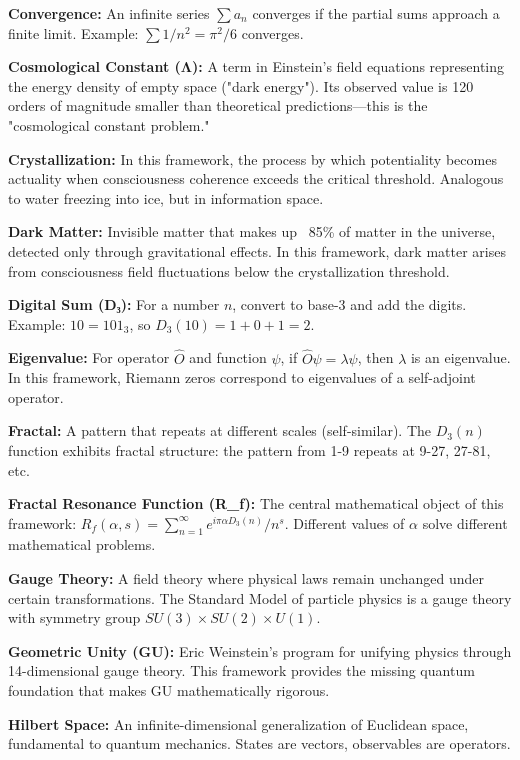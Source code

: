\noindent\textbf{Convergence:} An infinite series $\sum a_n$ converges if the partial sums approach a finite limit. Example: $\sum 1/n^2 = \pi^2/6$ converges.

\noindent\textbf{Cosmological Constant (Λ):} A term in Einstein's field equations representing the energy density of empty space ("dark energy"). Its observed value is 120 orders of magnitude smaller than theoretical predictions—this is the "cosmological constant problem."

\noindent\textbf{Crystallization:} In this framework, the process by which potentiality becomes actuality when consciousness coherence exceeds the critical threshold. Analogous to water freezing into ice, but in information space.

\noindent\textbf{Dark Matter:} Invisible matter that makes up ~85\% of matter in the universe, detected only through gravitational effects. In this framework, dark matter arises from consciousness field fluctuations below the crystallization threshold.

\noindent\textbf{Digital Sum (D₃):} For a number $n$, convert to base-3 and add the digits. Example: $10 = 101_3$, so $D_3(10) = 1 + 0 + 1 = 2$.

\noindent\textbf{Eigenvalue:} For operator $\hat{O}$ and function $\psi$, if $\hat{O}\psi = \lambda\psi$, then $\lambda$ is an eigenvalue. In this framework, Riemann zeros correspond to eigenvalues of a self-adjoint operator.

\noindent\textbf{Fractal:} A pattern that repeats at different scales (self-similar). The $D_3(n)$ function exhibits fractal structure: the pattern from 1-9 repeats at 9-27, 27-81, etc.

\noindent\textbf{Fractal Resonance Function (R_f):} The central mathematical object of this framework: $R_f(\alpha, s) = \sum_{n=1}^{\infty} e^{i\pi\alpha D_3(n)}/n^s$. Different values of $\alpha$ solve different mathematical problems.

\noindent\textbf{Gauge Theory:} A field theory where physical laws remain unchanged under certain transformations. The Standard Model of particle physics is a gauge theory with symmetry group $SU(3) \times SU(2) \times U(1)$.

\noindent\textbf{Geometric Unity (GU):} Eric Weinstein's program for unifying physics through 14-dimensional gauge theory. This framework provides the missing quantum foundation that makes GU mathematically rigorous.

\noindent\textbf{Hilbert Space:} An infinite-dimensional generalization of Euclidean space, fundamental to quantum mechanics. States are vectors, observables are operators.

